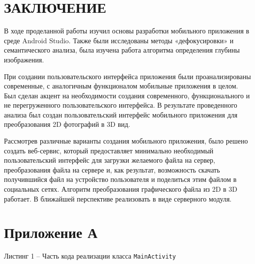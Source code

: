\documentclass[a4paper,12pt]{article}
\begin{document}
\section*{\centering ЗАКЛЮЧЕНИЕ}

В ходе проделанной работы изучил основы разработки мобильного приложения в среде Android Studio. Также были исследованы методы «дефокусировки» и семантического анализа, была изучена работа алгоритма определения глубины изображения.

При создании пользовательского интерфейса приложения были проанализированы современные, с аналогичным функционалом мобильные приложения в целом. Был сделан акцент на необходимости создания современного, функционального и не перегруженного пользовательского интерфейса. В результате проведенного анализа был создан пользовательский интерфейс мобильного приложения для преобразования 2D фотографий в 3D вид.

Рассмотрев различные варианты создания мобильного приложения, было решено создать веб-сервис, который предоставляет минимально необходимый пользовательский интерфейс для загрузки желаемого файла на сервер, преобразования файла на сервере и, как результат, возможность скачать получившийся файл на устройство пользователя и поделиться этим файлом в социальных сетях. Алгоритм преобразования графического файла из 2D в 3D работает. В ближайшей перспективе реализовать в виде серверного модуля. 


\pagebreak

\printbibliography

\pagebreak

\section*{ \centering Приложение А} 

\begin{center}
	Листинг 1 -- Часть кода реализации класса \verb|MainActivity|
\end{center}
\end{document}
